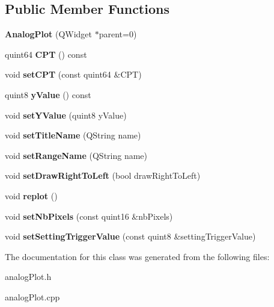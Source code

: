 \subsection*{Public Member Functions}
\begin{DoxyCompactItemize}
\item 
\mbox{\label{class_analog_plot_ae2b482baa376006f754ce47e427bca99}} 
{\bfseries Analog\+Plot} (Q\+Widget $\ast$parent=0)
\item 
\mbox{\label{class_analog_plot_ac40ef6c390ebddcf2f97db92504933a3}} 
quint64 {\bfseries C\+PT} () const
\item 
\mbox{\label{class_analog_plot_aca30d7d775350eb21dc7ed778c662791}} 
void {\bfseries set\+C\+PT} (const quint64 \&C\+PT)
\item 
\mbox{\label{class_analog_plot_a4b8726cf133454fef1e4e574ec31d738}} 
quint8 {\bfseries y\+Value} () const
\item 
\mbox{\label{class_analog_plot_a37ffe03ce1311324f84e651b7bc3ba51}} 
void {\bfseries set\+Y\+Value} (quint8 y\+Value)
\item 
\mbox{\label{class_analog_plot_aad00ba9042f5301bf819d3c636876110}} 
void {\bfseries set\+Title\+Name} (Q\+String name)
\item 
\mbox{\label{class_analog_plot_a1723c65e226ca1872d224e838c1bd4b1}} 
void {\bfseries set\+Range\+Name} (Q\+String name)
\item 
\mbox{\label{class_analog_plot_ac0f50464fd98d85f1e193dce931ebac6}} 
void {\bfseries set\+Draw\+Right\+To\+Left} (bool draw\+Right\+To\+Left)
\item 
\mbox{\label{class_analog_plot_aa9fef49a4219698979180ed3c4325611}} 
void {\bfseries replot} ()
\item 
\mbox{\label{class_analog_plot_a2bbfe7cd40b4dc16a3b09c03a7001c44}} 
void {\bfseries set\+Nb\+Pixels} (const quint16 \&nb\+Pixels)
\item 
\mbox{\label{class_analog_plot_a26b2f43521292ec8a9d6965d05841b6d}} 
void {\bfseries set\+Setting\+Trigger\+Value} (const quint8 \&setting\+Trigger\+Value)
\end{DoxyCompactItemize}


The documentation for this class was generated from the following files\+:\begin{DoxyCompactItemize}
\item 
analog\+Plot.\+h\item 
analog\+Plot.\+cpp\end{DoxyCompactItemize}
